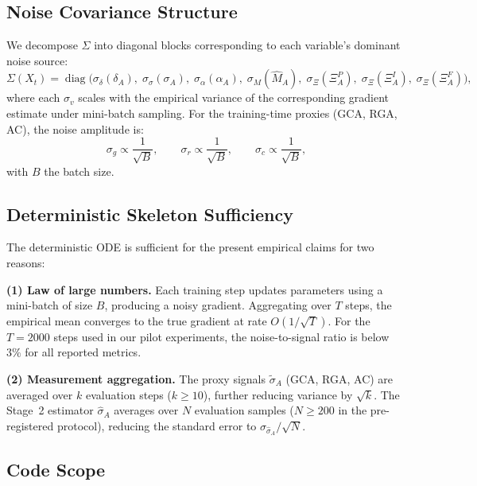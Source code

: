 \documentclass[10pt]{article}
\begin{document}
\subsection{Noise Covariance Structure}

We decompose $\Sigma$ into diagonal blocks corresponding to each variable's
dominant noise source:
\begin{equation}
\Sigma(X_t) = \operatorname{diag}\bigl(
\sigma_\delta(\delta_A),\; \sigma_\sigma(\sigma_A),\;
\sigma_\alpha(\alpha_A),\;\sigma_M(\hat{M}_A),\;
\sigma_\Xi(\Xi_A^P),\;\sigma_\Xi(\Xi_A^I),\;\sigma_\Xi(\Xi_A^F)
\bigr),
\end{equation}
where each $\sigma_v$ scales with the empirical variance of the
corresponding gradient estimate under mini-batch sampling. For the
training-time proxies (GCA, RGA, AC), the noise amplitude is:
\begin{equation}
\sigma_g \propto \frac{1}{\sqrt{B}}, \qquad
\sigma_r \propto \frac{1}{\sqrt{B}}, \qquad
\sigma_c \propto \frac{1}{\sqrt{B}},
\end{equation}
with $B$ the batch size.

\subsection{Deterministic Skeleton Sufficiency}

The deterministic ODE is sufficient for the present empirical claims
for two reasons:

\textbf{(1) Law of large numbers.} Each training step updates parameters
using a mini-batch of size $B$, producing a noisy gradient. Aggregating
over $T$ steps, the empirical mean converges to the true gradient at rate
$O(1/\sqrt{T})$. For the $T = 2000$ steps used in our pilot experiments,
the noise-to-signal ratio is below $3\%$ for all reported metrics.

\textbf{(2) Measurement aggregation.} The proxy signals
$\tilde{\sigma}_A$ (GCA, RGA, AC) are averaged over $k$ evaluation
steps ($k \geq 10$), further reducing variance by $\sqrt{k}$.
The Stage~2 estimator $\hat{\sigma}_A$ averages over $N$ evaluation
samples ($N \geq 200$ in the pre-registered protocol), reducing the
standard error to $\sigma_{\hat{\sigma}_A} / \sqrt{N}$.

\subsection{Code Scope}
\end{document}
